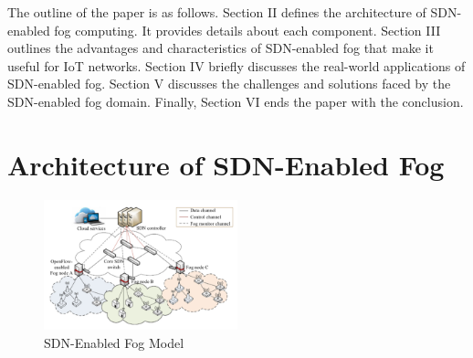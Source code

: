 \documentclass[conference]{IEEEtran}
\begin{document}
The outline of the paper is as follows. Section II defines the architecture of SDN-enabled fog computing. It provides details about each component. Section III outlines the advantages and characteristics of SDN-enabled fog that make it useful for IoT networks. Section IV briefly discusses the real-world applications of SDN-enabled fog. Section V discusses the challenges and solutions faced by the SDN-enabled fog domain. Finally, Section VI ends the paper with the conclusion.


\section{Architecture of SDN-Enabled Fog}

\begin{figure}[h]
    \centering
    \includegraphics[width=0.5\textwidth]{Images/sdn fog model.png}
    \caption{SDN-Enabled Fog Model}
    \label{fig:fog sdn model}
\end{figure}
\end{document}
